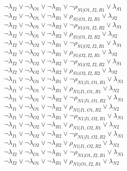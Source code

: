$\neg\lambda_{I2} \vee \neg\lambda_{O1} \vee \neg\lambda_{R1} \vee \neg\rho_{S1|O1,I2,R1} \vee \lambda_{S1}$\\
$\neg\lambda_{I2} \vee \neg\lambda_{O1} \vee \neg\lambda_{R1} \vee \rho_{S1|O1,I2,R1} \vee \lambda_{S2}$\\
$\neg\lambda_{I2} \vee \neg\lambda_{O1} \vee \neg\lambda_{R2} \vee \neg\rho_{S1|O1,I2,R2} \vee \lambda_{S1}$\\
$\neg\lambda_{I2} \vee \neg\lambda_{O1} \vee \neg\lambda_{R2} \vee \rho_{S1|O1,I2,R2} \vee \lambda_{S2}$\\
$\neg\lambda_{I2} \vee \neg\lambda_{O2} \vee \neg\lambda_{R1} \vee \neg\rho_{S1|O2,I2,R1} \vee \lambda_{S1}$\\
$\neg\lambda_{I2} \vee \neg\lambda_{O2} \vee \neg\lambda_{R1} \vee \rho_{S1|O2,I2,R1} \vee \lambda_{S2}$\\
$\neg\lambda_{I2} \vee \neg\lambda_{O2} \vee \neg\lambda_{R2} \vee \neg\rho_{S1|O2,I2,R2} \vee \lambda_{S1}$\\
$\neg\lambda_{I2} \vee \neg\lambda_{O2} \vee \neg\lambda_{R2} \vee \rho_{S1|O2,I2,R2} \vee \lambda_{S2}$\\
$\neg\lambda_{I1} \vee \neg\lambda_{O1} \vee \neg\lambda_{R1} \vee \neg\rho_{N1|I1,O1,R1} \vee \lambda_{N1}$\\
$\neg\lambda_{I1} \vee \neg\lambda_{O1} \vee \neg\lambda_{R1} \vee \rho_{N1|I1,O1,R1} \vee \lambda_{N2}$\\
$\neg\lambda_{I1} \vee \neg\lambda_{O1} \vee \neg\lambda_{R2} \vee \neg\rho_{N1|I1,O1,R2} \vee \lambda_{N1}$\\
$\neg\lambda_{I1} \vee \neg\lambda_{O1} \vee \neg\lambda_{R2} \vee \rho_{N1|I1,O1,R2} \vee \lambda_{N2}$\\
$\neg\lambda_{I1} \vee \neg\lambda_{O2} \vee \neg\lambda_{R1} \vee \neg\rho_{N1|I1,O2,R1} \vee \lambda_{N1}$\\
$\neg\lambda_{I1} \vee \neg\lambda_{O2} \vee \neg\lambda_{R1} \vee \rho_{N1|I1,O2,R1} \vee \lambda_{N2}$\\
$\neg\lambda_{I1} \vee \neg\lambda_{O2} \vee \neg\lambda_{R2} \vee \neg\rho_{N1|I1,O2,R2} \vee \lambda_{N1}$\\
$\neg\lambda_{I1} \vee \neg\lambda_{O2} \vee \neg\lambda_{R2} \vee \rho_{N1|I1,O2,R2} \vee \lambda_{N2}$\\
$\neg\lambda_{I2} \vee \neg\lambda_{O1} \vee \neg\lambda_{R1} \vee \neg\rho_{N1|O1,I2,R1} \vee \lambda_{N1}$\\
$\neg\lambda_{I2} \vee \neg\lambda_{O1} \vee \neg\lambda_{R1} \vee \rho_{N1|O1,I2,R1} \vee \lambda_{N2}$\\

